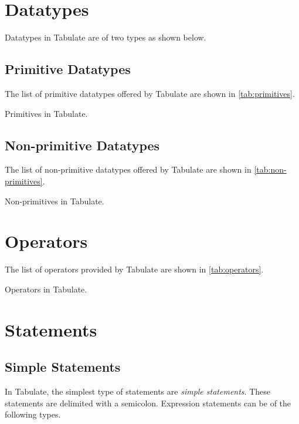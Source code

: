 \documentclass[conference,compsoc]{IEEEtran}
\begin{document}
\section{Datatypes}
Datatypes in Tabulate are of two types as shown below.

\subsection{Primitive Datatypes}
The list of primitive datatypes offered by Tabulate are shown in
\autoref{tab:primitives}.

\begin{table}[!ht]
  
  \vspace{3mm}
  \caption{Primitives in Tabulate.}
  \label{tab:primitives}
\end{table}

\subsection{Non-primitive Datatypes}
The list of non-primitive datatypes offered by Tabulate are shown in
\autoref{tab:non-primitives}.

\begin{table}[!ht]
  
  \vspace{3mm}
  \caption{Non-primitives in Tabulate.}
  \label{tab:non-primitives}
\end{table}

\section{Operators}
The list of operators provided by Tabulate are shown in \autoref{tab:operators}.

\begin{table*}[!ht]
  
  \vspace{3mm}
  \caption{Operators in Tabulate.}
  \label{tab:operators}
\end{table*}

\section{Statements}

\subsection{Simple Statements}
In Tabulate, the simplest type of statements are \emph{simple statements}.
These statements are delimited with a semicolon. Expression statements can be of
the following types.
\end{document}
